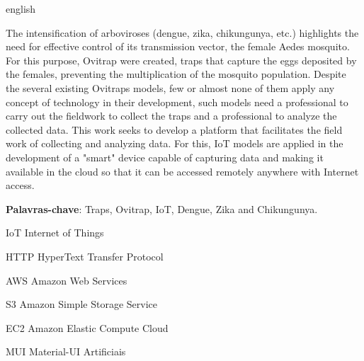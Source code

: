 \documentclass[
	12pt,				%
	openright,			%
	oneside,			%
	a4paper,			%
	chapter=TITLE,		%
	english,			%
	brazil				%
	]{abntex2}
\begin{document}
\begin{resumo}[Abstract]
\begin{otherlanguage*}{english}

The intensification of arboviroses (dengue, zika, chikungunya, etc.) highlights the need for effective control of its transmission vector, 
the female Aedes mosquito. For this purpose, Ovitrap were created, traps that capture the eggs deposited by the females, preventing the 
multiplication of the mosquito population. Despite the several existing Ovitraps models, few or almost none of them apply any concept of 
technology in their development, such models need a professional to carry out the fieldwork to collect the traps and a professional to 
analyze the collected data. This work seeks to develop a platform that facilitates the field work of collecting and analyzing data. For 
this, IoT models are applied in the development of a "smart" device capable of capturing data and making it available in the cloud so that 
it can be accessed remotely anywhere with Internet access.

\textbf{Palavras-chave}: Traps, Ovitrap, IoT, Dengue, Zika and Chikungunya.

\end{otherlanguage*}
\end{resumo}


\listoffigures*
\cleardoublepage

\listoftables*
\cleardoublepage

\begin{siglas}
  \item[IoT] Internet of Things
  \item[HTTP] HyperText Transfer Protocol
  \item[AWS] Amazon Web Services
  \item[S3] Amazon Simple Storage Service
  \item[EC2] Amazon Elastic Compute Cloud
  \item[MUI] Material-UI 
Artificiais 
\end{siglas}
\end{document}
